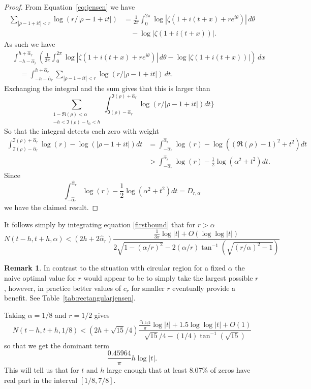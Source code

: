 \documentclass[10pt,english,letter, reqno]{amsart}
\theoremstyle{plain}
\theoremstyle{definition}
\newtheorem{remark}[theorem]{Remark}
\begin{document}
\begin{proof}
From Equation~\ref{eq:jensen} we have
\begin{align*} \sum_{|\rho - 1+it| < r}  \log(r/|\rho - 1+it|) &= \frac{1}{2\pi}\int_0^{2\pi} \log|\zeta(1+i(t+x)+re^{i\theta})|\,d\theta
\\&\quad - \log|\zeta(1+i(t+x))|. \end{align*}
As such we have
\begin{align*} &  \int_{-h-\hat{\alpha}_r}^{h+\hat{\alpha}_r} \left(\frac{1}{2\pi}\int_0^{2\pi} \log|\zeta(1+i(t+x)+re^{i\theta})|\,d\theta - \log|\zeta(1+i(t+x))|\right)\,dx \\
&\quad= \int_{-h-\hat{\alpha}_r}^{h+\hat{\alpha}_r}  \sum_{|\rho - 1+it| < r}  \log(r/|\rho - 1+it|)\,dt.
\end{align*}
Exchanging the integral and the sum gives that this is larger than
\[  \sum_{\substack{1-\Re(\rho)<\alpha\\-h<\Im(\rho)-t_0<h }}
\int_{\Im(\rho)-\hat{\alpha}_r}^{\Im(\rho)+\hat{\alpha}_r} \log(r/|\rho - 1+it|)dt  \}
\]
So that the integral detects each zero with weight 
\begin{align*} 
\int_{\Im(\rho)-\hat{\alpha}_r}^{\Im(\rho)+\hat{\alpha}_r} \log(r) -\log(|\rho - 1+it|)dt 
&= \int_{-\hat{\alpha}_r}^{\hat{\alpha}_r} \log(r) - \log((\Re(\rho) - 1)^2+t^2)dt \\
&> \int_{-\hat{\alpha}_r}^{\hat{\alpha}_r} \log(r) - \frac{1}{2}\log(\alpha^2+t^2)dt.
\end{align*}
Since
\[\int_{-\hat{\alpha}_r}^{\hat{\alpha}_r} \log(r) - \frac{1}{2}\log(\alpha^2+t^2)dt
=    D_{r,\alpha}
\]
 we have the claimed result.   
\end{proof}


It follows simply by integrating equation \eqref{firstbound} that for $r>\alpha$
\[ N(t-h,t+h,\alpha) < (2h+2\hat{\alpha}_r)\frac{\frac{1}{3\pi}\log|t| + O(\log\log|t|)}{2\sqrt{1-(\alpha/r)^2}-2(\alpha/r)\tan^{-1}(\sqrt{(r/\alpha)^2-1})} \]


\begin{remark}
    In contrast to the situation with circular region for a fixed $\alpha$ the naive optimal value for $r$ would appear to be to simply take the largest possible $r$, however, in practice better values of $c_r$ for smaller $r$ eventually provide a benefit. See Table~\ref{tab:rectangularjensen}.
 \end{remark}

Taking $\alpha=1/8$ and  $r=1/2$ gives
\[ N(t-h,t+h,1/8) < (2h+\sqrt{15}/4)\frac{\frac{c_{1,1/2}}{\pi}\log|t| + 1.5\log\log|t| + O(1)} {\sqrt{15}/4-(1/4)\tan^{-1}(\sqrt{15})}\]
so that we get the dominant term
\[ \frac{0.45964}{\pi} h \log|t|. \]
This will tell us that for $t$ and $h$ large enough that at least $8.07\%$ of zeros have real part in the interval $[1/8,7/8]$.
\end{document}
